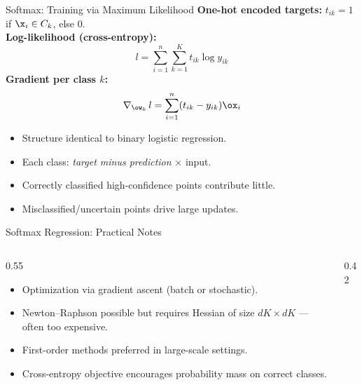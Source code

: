 \begin{frame}{Softmax: Training via Maximum Likelihood}
  \textbf{One-hot encoded targets:} $t_{ik} = 1$ if $\x_i \in C_k$, else $0$.\\[0.4em]
  \textbf{Log-likelihood (cross-entropy):}
  \[
    l = \sum_{i=1}^n\sum_{k=1}^K t_{ik}\log y_{ik}
  \]
  \textbf{Gradient per class $k$:}
  \[
    \nabla_{\ow_k}\,l = \sum_{i=1}^n (t_{ik} - y_{ik})\ox_i
  \]
  \begin{itemize}
    \item Structure identical to binary logistic regression.
    \item Each class: \emph{target minus prediction} $\times$ input.
    \item Correctly classified high-confidence points contribute little.
    \item Misclassified/uncertain points drive large updates.
  \end{itemize}
\end{frame}

\begin{frame}{Softmax Regression: Practical Notes}
  \begin{columns}[T]
    \begin{column}{0.55\textwidth}
      \begin{itemize}
        \item Optimization via gradient ascent (batch or stochastic).
        \item Newton--Raphson possible but requires Hessian of size $dK \times dK$ — often too expensive.
        \item First-order methods preferred in large-scale settings.
        \item Cross-entropy objective encourages probability mass on correct classes.
      \end{itemize}
    \end{column}
    \begin{column}{0.42\textwidth}
    \end{column}
  \end{columns}
\end{frame}

